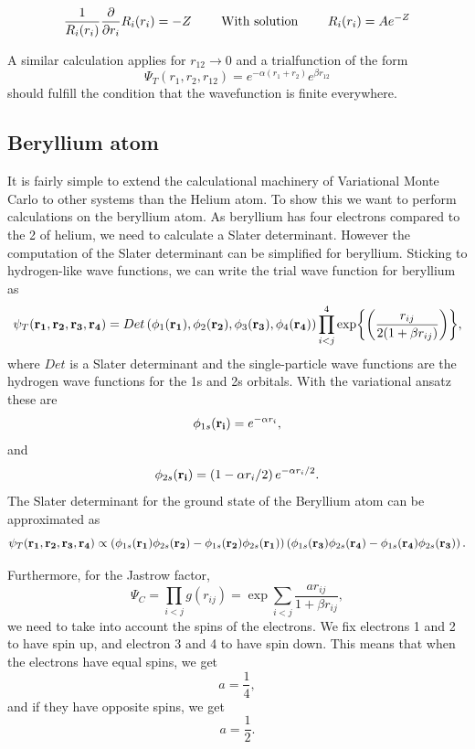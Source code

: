 \documentclass[11pt]{article}
\begin{document}
		\begin{align}
			 \frac{1}{R_i(r_i)} \pdv{}{r_i} R_i(r_i)	=  -Z  \qquad{ \text{ With solution }}  \qquad R_i(r_i) = A e^{-Z}
		\end{align}

		A similar calculation applies for \(r_{12} \rightarrow 0\) and a trialfunction of the form   \[\Psi_T(r_1,r_2,r_{12}) = e^{-\alpha (r_1 + r_2)} e^{\beta r_{12}} \] should fulfill the condition that the wavefunction is finite everywhere.




	\subsection{Beryllium atom}

		It is fairly simple to extend the calculational machinery of Variational
		Monte Carlo to other systems than the Helium atom. To show this we
		want to perform calculations on the beryllium atom. As beryllium has
		four electrons compared to the 2 of helium, we need to calculate a
		Slater determinant. However the computation of the Slater determinant
		can be simplified for beryllium. Sticking to hydrogen-like wave functions,
		we can write the trial wave function for beryllium as
		\begin{equation}
			\psi_{T}({\bf r_{1}},{\bf r_{2}},{\bf r_{3}},{\bf r_{4}})=Det\left(\phi_{1}({\bf r_{1}}),\phi_{2}({\bf r_{2}}),\phi_{3}({\bf r_{3}}),\phi_{4}({\bf r_{4}})\right)\prod_{i<j}^{4}\exp{\left(\frac{r_{ij}}{2(1+\beta r_{ij})}\right)},
		\end{equation}
		where $Det$ is a Slater determinant and the single-particle wave
		functions are the hydrogen wave functions for the 1s and 2s orbitals.
		With the variational ansatz these are
		\[
		\phi_{1s}({\bf r_{i}})=e^{-\alpha r_{i}},
		\]
		and 
		\[
		\phi_{2s}({\bf r_{i}})=\left(1-\alpha r_{i}/2\right)e^{-\alpha r_{i}/2}.
		\]
		The Slater determinant for the ground state of the Beryllium atom
		can be approximated as
		\[
		\psi_{T}({\bf r_{1}},{\bf r_{2}},{\bf r_{3}},{\bf r_{4}})\propto\left(\phi_{1s}({\bf r_{1}})\phi_{2s}({\bf r_{2}})-\phi_{1s}({\bf r_{2}})\phi_{2s}({\bf r_{1}})\right)\left(\phi_{1s}({\bf r_{3}})\phi_{2s}({\bf r_{4}})-\phi_{1s}({\bf r_{4}})\phi_{2s}({\bf r_{3}})\right).
		\]


		Furthermore, for the Jastrow factor, 
		\[
		\Psi_{C}=\prod_{i<j}g(r_{ij})=\exp{\sum_{i<j}\frac{ar_{ij}}{1+\beta r_{ij}}},
		\]
		we need to take into account the spins of the electrons. We fix electrons
		1 and 2 to have spin up, and electron 3 and 4 to have spin down. This
		means that when the electrons have equal spins, we get
		\[
		a=\frac{1}{4},
		\]
		and if they have opposite spins, we get
		\[
		a=\frac{1}{2}.
		\]
\end{document}
